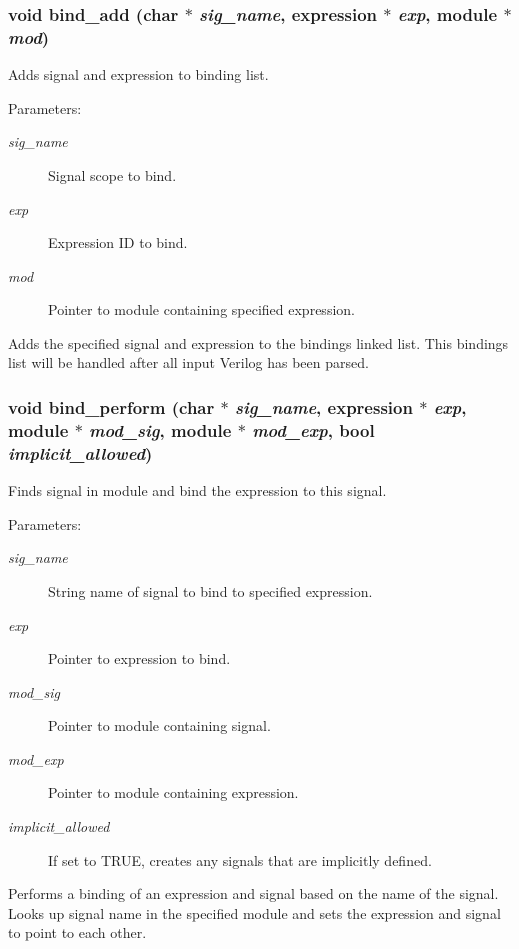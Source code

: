 \subsubsection{\setlength{\rightskip}{0pt plus 5cm}void bind\_\-add (char $\ast$ {\em sig\_\-name}, {\bf expression} $\ast$ {\em exp}, {\bf module} $\ast$ {\em mod})}\label{binding_8c_a5}


Adds signal and expression to binding list.

\begin{Desc}
\item[Parameters: ]\par
\begin{description}
\item[{\em 
sig\_\-name}]Signal scope to bind. \item[{\em 
exp}]Expression ID to bind. \item[{\em 
mod}]Pointer to module containing specified expression.\end{description}
\end{Desc}
Adds the specified signal and expression to the bindings linked list. This bindings list will be handled after all input Verilog has been parsed. 
\subsubsection{\setlength{\rightskip}{0pt plus 5cm}void bind\_\-perform (char $\ast$ {\em sig\_\-name}, {\bf expression} $\ast$ {\em exp}, {\bf module} $\ast$ {\em mod\_\-sig}, {\bf module} $\ast$ {\em mod\_\-exp}, {\bf bool} {\em implicit\_\-allowed})}\label{binding_8c_a7}


Finds signal in module and bind the expression to this signal.

\begin{Desc}
\item[Parameters: ]\par
\begin{description}
\item[{\em 
sig\_\-name}]String name of signal to bind to specified expression. \item[{\em 
exp}]Pointer to expression to bind. \item[{\em 
mod\_\-sig}]Pointer to module containing signal. \item[{\em 
mod\_\-exp}]Pointer to module containing expression. \item[{\em 
implicit\_\-allowed}]If set to TRUE, creates any signals that are implicitly defined.\end{description}
\end{Desc}
Performs a binding of an expression and signal based on the name of the signal. Looks up signal name in the specified module and sets the expression and signal to point to each other. 
